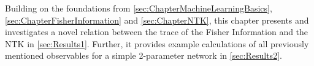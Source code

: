 Building on the foundations from \cref{sec:ChapterMachineLearningBasics}, \cref{sec:ChapterFisherInformation} and \cref{sec:ChapterNTK}, this chapter presents and investigates a novel relation between the trace of the Fisher Information and the NTK in \cref{sec:Results1}. Further, it provides example calculations of all previously mentioned observables for a simple 2-parameter network in \cref{sec:Results2}.